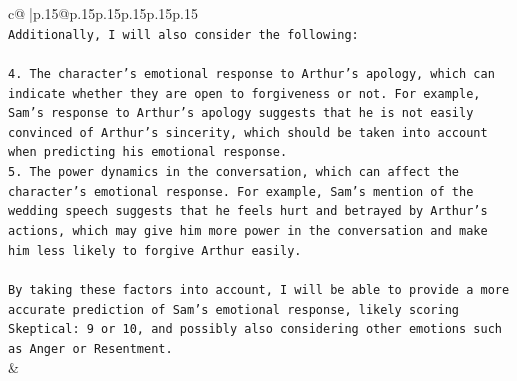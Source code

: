\documentclass{article}
\begin{document}
{\begin{supertabular}{c@{$\;$}|p{.15\linewidth}@{}p{.15\linewidth}p{.15\linewidth}p{.15\linewidth}p{.15\linewidth}p{.15\linewidth}}
{{{\\ 
\texttt{Additionally, I will also consider the following:} \\
\\ 
\texttt{4. The character's emotional response to Arthur's apology, which can indicate whether they are open to forgiveness or not. For example, Sam's response to Arthur's apology suggests that he is not easily convinced of Arthur's sincerity, which should be taken into account when predicting his emotional response.} \\
\texttt{5. The power dynamics in the conversation, which can affect the character's emotional response. For example, Sam's mention of the wedding speech suggests that he feels hurt and betrayed by Arthur's actions, which may give him more power in the conversation and make him less likely to forgive Arthur easily.} \\
\\ 
\texttt{By taking these factors into account, I will be able to provide a more accurate prediction of Sam's emotional response, likely scoring Skeptical: 9 or 10, and possibly also considering other emotions such as Anger or Resentment.} \\
            }
        }
    }
    & \\ \\

\end{supertabular}
}
\end{document}

